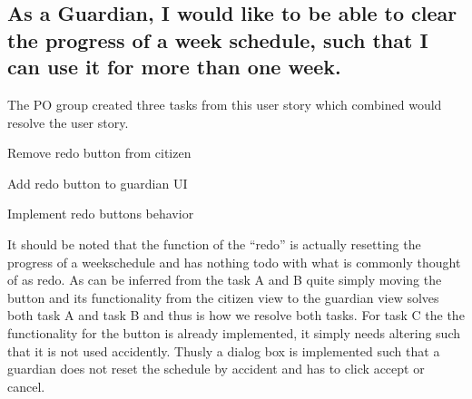 \subsection{As a Guardian, I would like to be able to clear the progress of a week schedule, such that I can use it for more than one week.}
The PO group created three tasks from this user story which combined would resolve the user story.
\begin{eletterate}
    \item Remove redo button from citizen
    \item Add redo button to guardian UI
    \item Implement redo buttons behavior
\end{eletterate}
It should be noted that the function of the \enquote{redo} is actually resetting the progress of a weekschedule and has nothing todo with what is commonly thought of as redo.
As can be inferred from the task A and B quite simply moving the button and its functionality from the citizen view to the guardian view solves both task A and task B and thus is how we resolve both tasks.
For task C the the functionality for the button is already implemented, it simply needs altering such that it is not used accidently.
Thusly a dialog box is implemented such that a guardian does not reset the schedule by accident and has to click accept or cancel.